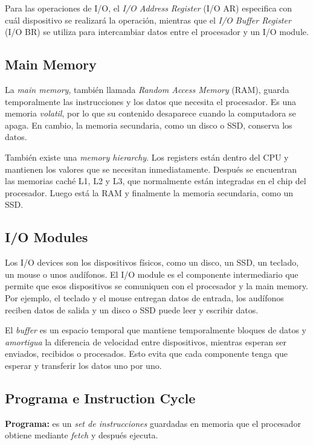 \documentclass[12pt,oneside]{template/liverpoolthesis}
\begin{document}
Para las operaciones de I/O, el \textit{I/O Address Register} (I/O AR)
especifica con cuál dispositivo se realizará la operación, mientras que el
\textit{I/O Buffer Register} (I/O BR) se utiliza para intercambiar datos entre
el procesador y un I/O module.

\subsection{Main Memory}

La \textit{main memory}, también llamada
\textit{Random Access Memory} (RAM), guarda temporalmente las instrucciones y
los datos que necesita el procesador. Es una memoria \textit{volatil}, por lo que su
contenido desaparece cuando la computadora se apaga. En cambio, la memoria
secundaria, como un disco o SSD, conserva los datos.

También existe una \textit{memory hierarchy}. Los registers están dentro del
CPU y mantienen los valores que se necesitan inmediatamente. Después se
encuentran las memorias caché L1, L2 y L3, que normalmente están integradas en
el chip del procesador. Luego está la RAM y finalmente la memoria secundaria,
como un SSD.

\subsection{I/O Modules}

Los I/O devices son los dispositivos físicos, como un disco, un SSD, un
teclado, un mouse o unos audífonos.
El I/O module es el componente intermediario que permite que esos dispositivos
se comuniquen con el procesador y la main memory. Por ejemplo, el teclado y el
mouse entregan datos de entrada, los audífonos reciben datos de salida y un
disco o SSD puede leer y escribir datos.

El \textit{buffer} es un espacio temporal que
mantiene temporalmente bloques de datos y \textit{amortigua} la diferencia de
velocidad entre dispositivos, mientras esperan ser enviados, recibidos o procesados. Esto evita que cada
componente tenga que esperar y transferir los datos uno por uno.

\subsection{Programa e Instruction Cycle}

\textbf{Programa:} es un \textit{set de instrucciones} guardadas en memoria
que el procesador obtiene mediante \textit{fetch} y después ejecuta.
\end{document}
